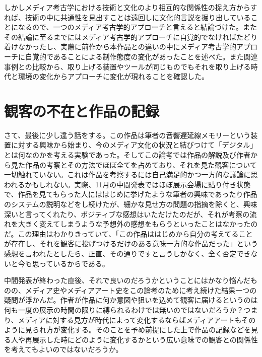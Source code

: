 \documentclass[a4paper,report]{jsbook}
\begin{document}
しかしメディア考古学における技術と文化のより相互的な関係性の捉え方からすれば、技術の中に共通性を見出すことは遠回しに文化的言説を掘り出していることになるので、一つのメディア考古学的アプローチと言えると結論づけた。またその結論に至るまでにはメディア考古学的アプローチに自覚的でなければたどり着けなかったし、実際に前作から本作品との違いの中にメディア考古学的アプローチに自覚的であることによる制作態度の変化があったことを述べた。また関連事例との比較から、取り上げる装置やツールが同じものでもそれを取り上げる時代と環境の変化からアプローチに変化が現れることを確認した。

\section{観客の不在と作品の記録}\label{ux89b3ux5ba2ux306eux4e0dux5728ux3068ux4f5cux54c1ux306eux8a18ux9332}

さて、最後に少し違う話をする。この作品は筆者の音響遅延線メモリーという装置に対する興味から始まり、今のメディア文化の状況と結びつけて「デジタル」とは何なのかを考える実験であった。そしてこの論考では作品の解説及び作者から見た作品の考察とその方法でほぼ全てを占めており、それを見た観客について一切触れていない。これは作品を考察するには自己満足的かつ一方的な議論に思われるかもしれない。実際、11月の中間発表ではほぼ展示会場に貼り付き状態で、作品を見てもらった人にははじめに挙げたような筆者の興味であったり作品のシステムの説明などをし続けたが、細かな見せ方の問題の指摘を除くと、興味深いと言ってくれたり、ポジティブな感想はいただけたのだが、それが考察の流れを大きく変えてしまうような予想外の感想をもらうといったことはなかったのだ。この理由はわかりきっていて、「この作品ははじめから自分の考えてることが存在し、それを観客に投げつけるだけのある意味一方的な作品だった」という感想を言われたとしたら、正直、その通りですと言うしかなく、全く否定できないと今も思っているからである。

中間発表が終わった直後、それで良いのだろうかということにはかなり悩んだものの、メディア史やメディアアート史をこの論考のために考え続けた結果一つの疑問が浮かんだ。作者が作品に何か意図や狙いを込めて観客に届けるというのは何も一度の展示の時間の限りに縛られるわけでは無いのではないだろうか？つまり、メディアに対する見方が時代によって変化するならばメディアアートもそのように見られ方が変化する。そのことを予め前提にした上で作品の記録などを見る人や再展示した時にどのように変化するかという広い意味での観客との関係性を考えてもよいのではないだろうか。
\end{document}
